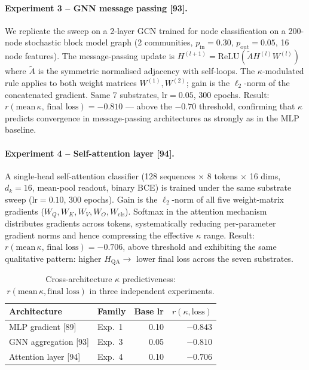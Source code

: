 \documentclass[11pt]{article}
\theoremstyle{definition}
\theoremstyle{remark}
\newcommand{\hqa}{H_{\mathrm{QA}}}
\begin{document}
\paragraph{Experiment 3 -- GNN message passing [93].}
We replicate the sweep on a 2-layer GCN trained for node classification on a
200-node stochastic block model graph (2 communities, $p_{\mathrm{in}}=0.30$,
$p_{\mathrm{out}}=0.05$, 16 node features). The message-passing update is
$H^{(l+1)}=\mathrm{ReLU}(\tilde{A}H^{(l)}W^{(l)})$ where $\tilde{A}$ is the
symmetric normalised adjacency with self-loops. The $\kappa$-modulated rule applies
to both weight matrices $W^{(1)},W^{(2)}$; gain is the $\ell_2$-norm of the
concatenated gradient.
Same 7 substrates, $\mathrm{lr}=0.05$, 300 epochs.
Result: $r(\text{mean}\,\kappa,\,\text{final loss})=-0.810$ --- above the
$-0.70$ threshold, confirming that $\kappa$ predicts convergence in message-passing
architectures as strongly as in the MLP baseline.

\paragraph{Experiment 4 -- Self-attention layer [94].}
A single-head self-attention classifier (128 sequences $\times$ 8 tokens $\times$
16 dims, $d_k=16$, mean-pool readout, binary BCE) is trained under the same
substrate sweep ($\mathrm{lr}=0.10$, 300 epochs). Gain is the $\ell_2$-norm of
all five weight-matrix gradients ($W_Q,W_K,W_V,W_O,W_{\mathrm{cls}}$).
Softmax in the attention mechanism distributes gradients across tokens,
systematically reducing per-parameter gradient norms and hence compressing the
effective $\kappa$ range.
Result: $r(\text{mean}\,\kappa,\,\text{final loss})=-0.706$, above threshold and
exhibiting the same qualitative pattern: higher $\hqa\to$ lower final loss across
the seven substrates.

\begin{table}[h]
\centering
\caption{Cross-architecture $\kappa$ predictiveness: $r(\text{mean}\,\kappa, \text{final loss})$
  in three independent experiments.}
\begin{tabular}{llrr}
\toprule
Architecture & Family & Base lr & $r(\kappa, \text{loss})$ \\
\midrule
MLP gradient [89]       & Exp.\ 1 & 0.10 & $-0.843$ \\
GNN aggregation [93]    & Exp.\ 3 & 0.05 & $-0.810$ \\
Attention layer [94]    & Exp.\ 4 & 0.10 & $-0.706$ \\
\bottomrule
\end{tabular}
\label{tab:cross-arch}
\end{table}
\end{document}
